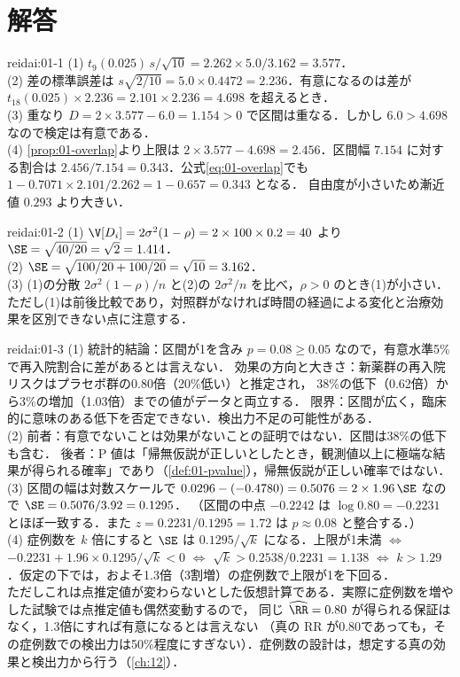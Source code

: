 \section{解答}\label{sec:01-sol}
\enlargethispage{1\baselineskip}
\begin{kaitou}{reidai:01-1}
(1) $t_9(0.025)\,s/\sqrt{10}=2.262\times5.0/3.162=3.577$．\\
(2) 差の標準誤差は $s\sqrt{2/10}=5.0\times0.4472=2.236$．有意になるのは差が $t_{18}(0.025)\times2.236=2.101\times2.236=4.698$ を超えるとき．\\
(3) 重なり $D=2\times3.577-6.0=1.154>0$ で区間は重なる．しかし $6.0>4.698$ なので検定は有意である．\\
(4) \cref{prop:01-overlap}より上限は $2\times3.577-4.698=2.456$．区間幅 $7.154$ に対する割合は
$2.456/7.154=0.343$．公式\cref{eq:01-overlap}でも $1-0.7071\times2.101/2.262=1-0.657=0.343$ となる．
自由度が小さいため漸近値 $0.293$ より大きい．
\end{kaitou}

\begin{kaitou}{reidai:01-2}
(1) $\V[D_i]=2\sigma^2(1-\rho)=2\times100\times0.2=40$ より $\SE=\sqrt{40/20}=\sqrt2=1.414$．\\
(2) $\SE=\sqrt{100/20+100/20}=\sqrt{10}=3.162$．\\
(3) (1)の分散 $2\sigma^2(1-\rho)/n$ と(2)の $2\sigma^2/n$ を比べ，$\rho>0$ のとき(1)が小さい．
ただし(1)は前後比較であり，対照群がなければ時間の経過による変化と治療効果を区別できない点に注意する．
\end{kaitou}

\begin{kaitou}{reidai:01-3}
(1) 統計的結論：区間が1を含み $p=0.08\ge0.05$ なので，有意水準5\%で再入院割合に差があるとは言えない．
効果の方向と大きさ：新薬群の再入院リスクはプラセボ群の0.80倍（20\%低い）と推定され，
38\%の低下（0.62倍）から3\%の増加（1.03倍）までの値がデータと両立する．
限界：区間が広く，臨床的に意味のある低下を否定できない．検出力不足の可能性がある．\\
(2) 前者：有意でないことは効果がないことの証明ではない．区間は38\%の低下も含む．
後者：P 値は「帰無仮説が正しいとしたとき，観測値以上に極端な結果が得られる確率」であり（\cref{def:01-pvalue}），帰無仮説が正しい確率ではない．\\
(3) 区間の幅は対数スケールで $0.0296-(-0.4780)=0.5076=2\times1.96\,\SE$ なので $\SE=0.5076/3.92=0.1295$．
（区間の中点 $-0.2242$ は $\log0.80=-0.2231$ とほぼ一致する．また $z=0.2231/0.1295=1.72$ は $p\approx0.08$ と整合する．）\\
(4) 症例数を $k$ 倍にすると $\SE$ は $0.1295/\sqrt k$ になる．上限が1未満 $\iff$ $-0.2231+1.96\times0.1295/\sqrt k<0$
$\iff$ $\sqrt k>0.2538/0.2231=1.138$ $\iff$ $k>1.29$．仮定の下では，およそ1.3倍（3割増）の症例数で上限が1を下回る．\\
ただしこれは点推定値が変わらないとした仮想計算である．実際に症例数を増やした試験では点推定値も偶然変動するので，
同じ $\widehat{\RR}=0.80$ が得られる保証はなく，1.3倍にすれば有意になるとは言えない
（真の RR が0.80であっても，その症例数での検出力は50\%程度にすぎない）．症例数の設計は，想定する真の効果と検出力から行う（\cref{ch:12}）．
\end{kaitou}

